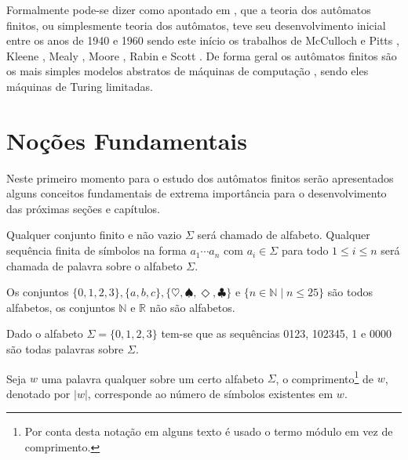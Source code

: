 Formalmente pode-se dizer como apontado em \cite{valdi2020phd}, que a teoria dos autômatos finitos, ou simplesmente teoria dos autômatos, teve seu desenvolvimento inicial entre os anos de 1940 e 1960 sendo este início os trabalhos de McCulloch e Pitts \cite{mcculloch1943}, Kleene \cite{kleene1951}, Mealy \cite{mealy1955}, Moore \cite{moore1956}, Rabin e Scott \cite{rabin1963, rabin1959}. De forma geral os autômatos finitos são os mais simples modelos abstratos de máquinas de computação \cite{farias2017}, sendo eles máquinas de Turing limitadas.

\section{Noções Fundamentais}\label{sec:FundamentalFormalLanguage}

Neste primeiro momento para o estudo dos autômatos finitos serão apresentados alguns conceitos fundamentais de extrema importância para o desenvolvimento das próximas seções e capítulos.

\begin{definicao}\label{def:AlfabetoPalavra}
	\cite{valdi2016master} Qualquer conjunto finito e não vazio $\Sigma$ será chamado de alfabeto. Qualquer sequência finita de símbolos na forma $a_1\cdots a_n$ com $a_i \in \Sigma$ para todo $1 \leq i \leq n$ será chamada de palavra sobre o alfabeto $\Sigma$.
\end{definicao}

\begin{exemplo}
	Os conjuntos $\{0, 1, 2, 3\}, \{a, b, c\}, \{\heartsuit,\spadesuit, \Diamond, \clubsuit\}$ e $\{n \in \mathbb{N} \mid n \leq 25\}$ são todos alfabetos, os conjuntos $\mathbb{N}$ e $\mathbb{R}$ não são alfabetos.
\end{exemplo}

\begin{exemplo}
	Dado o alfabeto $\Sigma = \{0, 1, 2, 3\}$ tem-se que as sequências 0123, 102345, 1 e 0000 são todas palavras sobre $\Sigma$.
\end{exemplo}

\begin{definicao}\label{def:ComprimentoPalavra}
	Seja $w$ uma palavra qualquer sobre um certo alfabeto $\Sigma$, o comprimento\footnote{Por conta desta notação em alguns texto é usado o termo módulo em vez de comprimento.} de $w$, denotado por $|w|$, corresponde ao número de símbolos existentes em $w$.
\end{definicao}

